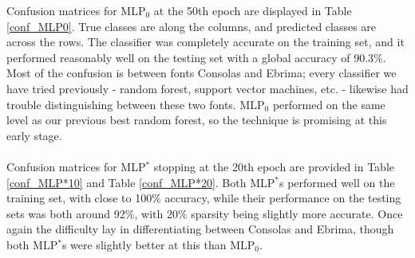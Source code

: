 \documentclass{homework}
\begin{document}
Confusion matrices for MLP$_0$ at the 50th epoch are displayed in Table \ref{conf_MLP0}. True classes are along the columns, and predicted classes are across the rows. The classifier was completely accurate on the training set, and it performed reasonably well on the testing set with a global accuracy of 90.3\%. Most of the confusion is between fonts Consolas and Ebrima; every classifier we have tried previously - random forest, support vector machines, etc. - likewise had trouble distinguishing between these two fonts. MLP$_0$ performed on the same level as our previous best random forest, so the technique is promising at this early stage.\\\\
Confusion matrices for MLP$^*$ stopping at the 20th epoch are provided in Table \ref{conf_MLP*10} and Table \ref{conf_MLP*20}. Both MLP$^*$s performed well on the training set, with close to 100\% accuracy, while their performance on the testing sets was both around 92\%, with 20\% sparsity being slightly more accurate. Once again the difficulty lay in differentiating between Consolas and Ebrima, though  both MLP$^*$s were slightly better at this than MLP$_0$.

\begin{table}[H]
    \centering
    \\
    \caption{Confusion Matrices for MLP$_0$ at the 50th Epoch}
    \label{conf_MLP0}
\end{table}
\end{document}
